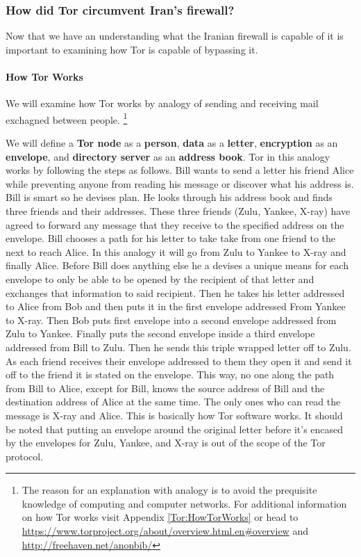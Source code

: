 \documentclass[11pt]{article}
\begin{document}
\begin{multicols}{2}
\subsubsection{How did Tor circumvent Iran's firewall?}

Now that we have an understanding what the Iranian firewall is capable of it is
important to examining how Tor is capable of bypassing it.

\paragraph{How Tor Works}
\label{HowTorWorks}
We will examine how Tor works by analogy of sending and receiving mail 
exchagned between people. 
\footnote{The reason for an explanation with analogy is to avoid the prequisite
  knowledge of computing and computer networks. For additional information on how 
  Tor works visit Appendix \ref{Tor:HowTorWorks} or head to
  \url{https://www.torproject.org/about/overview.html.en#overview} and
\url{http://freehaven.net/anonbib/}
}

We will define a \textbf{Tor node} as a \textbf{person}, \textbf{data} as a
\textbf{letter}, \textbf{encryption} as an \textbf{envelope}, and
\textbf{directory server} as an \textbf{address book}. Tor in this analogy works
by following the steps as follows. Bill wants to send a letter his friend Alice
while preventing anyone from reading his message or discover what his address is.  Bill
is smart so he devises plan. He looks through his address book and finds three
friends and their addresses.  These three friends (Zulu, Yankee, X-ray)
have agreed to forward any message that they receive to the
specified address on the envelope. Bill chooses a path for his letter to take take from one friend
to the next to reach Alice. In this analogy it will go from Zulu to Yankee to
X-ray and finally Alice. Before Bill does anything else he a devises a unique
means for each envelope to only be able to be opened by the recipient of that
letter and exchanges that information to said recipient.  Then he takes his letter addressed to Alice from Bob and then
puts it in the first envelope addressed From Yankee to X-ray.  Then Bob puts first
envelope into a second envelope addressed from Zulu to Yankee.  Finally puts the second
envelope inside a third envelope addressed from Bill to Zulu.  Then he sends
this triple wrapped letter off to Zulu.  As each friend receives their envelope addressed to them
they open it and send it off to the friend it is stated on the envelope.  This
way, no one along the path from Bill to Alice, except for Bill, knows the source address of
Bill and the destination address of Alice at the same time.  The
only ones who can read the message is X-ray and Alice. This is basically how Tor
software works. It should be noted that putting an envelope around the original letter
before it's encased by the envelopes for Zulu, Yankee, and X-ray is out of
the scope of the Tor protocol.


\end{multicols}
\end{document}
